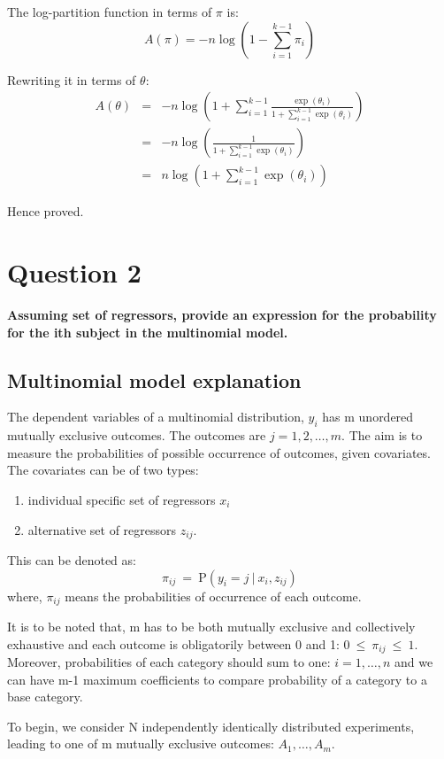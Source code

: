 \documentclass[12pt]{article}
\begin{document}
The log-partition function in terms of \(\pi\) is:
\[ A(\pi) = -n \log (1 - \sum_{i=1} ^{k-1} \pi_i)\]

Rewriting it in terms of \(\theta\):
\begin{eqnarray*}
    A(\theta) &=& - n \log \left(1 + \sum_{i=1}^{k-1} \frac{\exp(\theta_i)}{1 + \sum_{i=1}^{k-1} \exp(\theta_i)} \right) \\
              &=& - n \log \left( \frac{1}{1 + \sum_{i=1}^{k-1} \exp(\theta_i)} \right) \\
              &=& n \log \left(1 + \sum_{i=1}^{k-1} \exp(\theta_i)\right)
\end{eqnarray*}

Hence proved.
\section{Question 2}
\textbf{Assuming set of regressors, provide an expression for the probability for the ith subject in the multinomial model.}
\subsection{Multinomial model explanation}


The dependent variables of a multinomial distribution, $y_i$ has m unordered mutually exclusive outcomes. The outcomes are $j= 1, 2,\dots, m$. The aim is to measure the probabilities of possible occurrence of outcomes, given covariates. The covariates can be of two types: 
\begin{enumerate}
    \item  individual specific set of regressors $x_i$
    \item alternative set of regressors $z_{ij}$. 
\end{enumerate}

This can be denoted as:
\begin{equation*}
  \pi_{ij} ~=~ \text{P}(y_i = j ~|~ x_i, z_{ij})
\end{equation*}
where, $\pi_{ij}$ means the probabilities of occurrence of each outcome.

It is to be noted that, m has to be both mutually exclusive and collectively exhaustive and each outcome is obligatorily between 0 and 1: $0 ~\le~ \pi_{ij} ~\le~ 1$. Moreover, probabilities of each category should sum to one: $i = 1, \dots, n$ and we can have m-1 maximum coefficients to compare probability of a category to a base category.

To begin, we consider N independently identically distributed experiments, leading to one of m mutually exclusive outcomes:  $A_1, \dots, A_m$.
\end{document}
